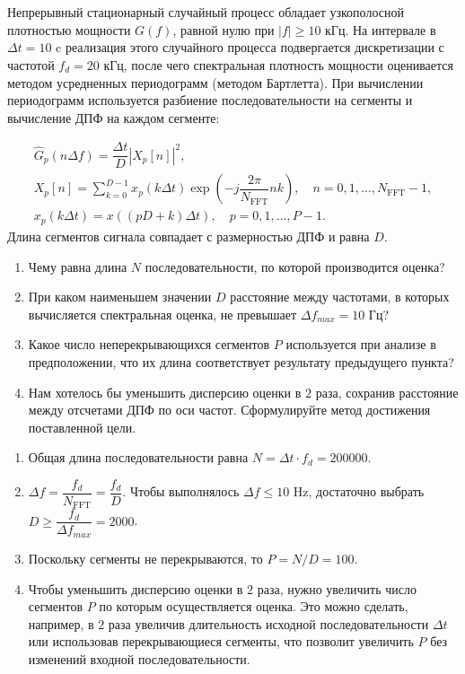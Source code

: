 \protect\thispagestyle{fancy}
\section{}
Непрерывный стационарный случайный процесс обладает узкополосной плотностью мощности $G(f)$, равной нулю при $|f|\geq10$ кГц.
На интервале в $\Delta t = 10$ c реализация этого случайного процесса подвергается дискретизации с частотой
$f_d = 20$ кГц, после чего спектральная плотность мощности оценивается методом усредненных периодограмм (методом Бартлетта). При вычислении периодограмм используется разбиение последовательности на сегменты и вычисление ДПФ на каждом сегменте:

\begin{gather*}
\hat{G}_p(n\Delta f) = \dfrac{\Delta t}{D} |X_p[n]|^2,\\
X_p[n] = \sum\limits_{k=0}^{D-1}x_p(k\Delta t)\exp\left(-j\dfrac{2\pi}{N_{\text{FFT}}}nk\right),
\quad n=0, 1, \ldots, N_{\text{FFT}}-1,\\
x_p(k\Delta t) = x\left((pD+k)\Delta t\right),\quad p=0,1,\ldots, P-1.
\end{gather*}
Длина сегментов сигнала совпадает с размерностью ДПФ и равна $D$.


\begin{enumerate}[label=(\alph*)]
	\item Чему равна длина $N$ последовательности, по которой производится оценка?
	\item При каком наименьшем значении $D$ расстояние между частотами,	в которых вычисляется спектральная оценка, не превышает $\Delta f_{max} = 10$ Гц?
	\item Какое число неперекрывающихся сегментов $P$ используется при анализе в предположении, что их длина соответствует результату предыдущего пункта?
	\item Нам хотелось бы уменьшить дисперсию оценки в $2$ раза, сохранив	расстояние между отсчетами ДПФ по оси частот. Сформулируйте метод достижения поставленной цели.
\end{enumerate}

\vspace{1cm}
\begin{enumerate}[label=(\alph*)]
	\item Общая длина последовательности равна $N = \Delta t \cdot f_d = 200000$.
	\item $\Delta f = \dfrac{f_d}{N_{\text{FFT}}} = \dfrac{f_d}{D}$. Чтобы выполнялось $\Delta f \leq 10$ Hz, достаточно выбрать $D \geq \dfrac{f_d}{\Delta f_{max}} = 2000$.
	\item Поскольку сегменты не перекрываются, то $P = N/D = 100$.
	\item Чтобы уменьшить дисперсию оценки в $2$ раза, нужно увеличить число сегментов $P$ по которым осуществляется оценка. Это можно сделать, например, в $2$ раза увеличив длительность исходной последовательности $\Delta t$ или использовав перекрывающиеся сегменты, что позволит увеличить $P$ без изменений входной последовательности.
\end{enumerate}

